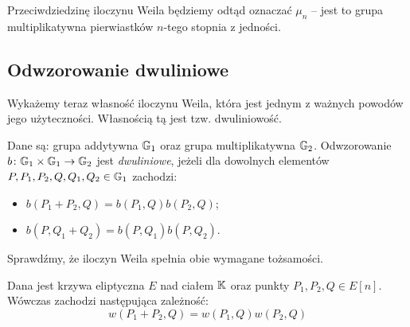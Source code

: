 \begin{remark}
Przeciwdziedzinę iloczynu Weila będziemy odtąd oznaczać $\mu_n$ --
jest to grupa multiplikatywna pierwiastków $n$-tego stopnia
z jedności.
\end{remark}

\subsection*{Odwzorowanie dwuliniowe}

Wykażemy teraz własność iloczynu Weila,
która jest jednym z ważnych powodów jego użyteczności.
Własnością tą jest tzw. dwuliniowość.

\begin{definition}
Dane są: grupa addytywna $\mathbb{G}_1$ oraz grupa multiplikatywna $\mathbb{G}_2$.
Odwzorowanie $b\colon \mathbb{G}_1 \times \mathbb{G}_1 \to \mathbb{G}_2$
jest \emph{dwuliniowe},
jeżeli dla dowolnych elementów $P, P_1, P_2, Q, Q_1, Q_2 \in \mathbb{G}_1$ zachodzi:
\begin{itemize}
\item $b(P_1 + P_2, Q) = b(P_1, Q)b(P_2, Q)$;
\item $b(P, Q_1 + Q_2) = b(P, Q_1)b(P, Q_2)$.
\end{itemize}
\end{definition}

Sprawdźmy, że iloczyn Weila spełnia obie wymagane tożsamości.

\begin{lemma}
Dana jest krzywa eliptyczna $E$ nad ciałem $\mathbb{K}$
oraz punkty $P_1, P_2, Q \in E[n]$.
Wówczas zachodzi następująca zależność:
\begin{equation}
w(P_1 + P_2, Q) = w(P_1, Q)w(P_2, Q)
\end{equation}
\end{lemma}

